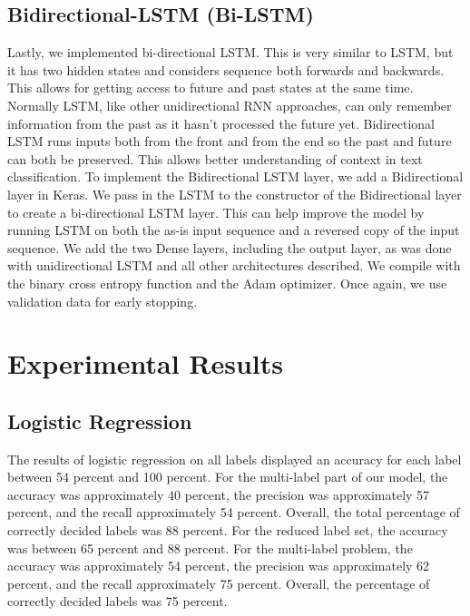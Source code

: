 \documentclass[sigconf]{acmart}
\begin{document}
\subsection{Bidirectional-LSTM (Bi-LSTM)}
Lastly, we implemented bi-directional LSTM.  This is very similar to LSTM, but it has two hidden states and considers sequence both forwards and backwards. This allows for getting access to future and past states at the same time. Normally LSTM, like other unidirectional RNN approaches, can only remember information from the past as it hasn't processed the future yet. Bidirectional LSTM runs inputs both from the front and from the end so the past and future can both be preserved.  This allows better understanding of context in text classification. To implement the Bidirectional LSTM layer, we add a Bidirectional layer in Keras. We pass in the LSTM to the constructor of the Bidirectional layer to create a bi-directional LSTM layer. This can help improve the model by running LSTM on both the as-is input sequence and a reversed copy of the input sequence. We add the two Dense layers, including the output layer, as was done with unidirectional LSTM and all other architectures described. We compile with the binary cross entropy function and the Adam optimizer.  Once again, we use validation data for early stopping. 

\section{Experimental Results}
\subsection{Logistic Regression}
The results of logistic regression on all labels displayed an accuracy for each label between 54 percent and 100 percent. For the multi-label part of our model, the accuracy was approximately 40 percent, the precision was approximately 57 percent, and the recall approximately 54 percent. Overall, the total percentage of correctly decided labels was 88 percent. For the reduced label set, the accuracy was between 65 percent and 88 percent. For the multi-label problem, the accuracy was approximately 54 percent, the precision was approximately 62 percent, and the recall approximately 75 percent. Overall, the percentage of correctly decided labels was 75 percent.
\end{document}

